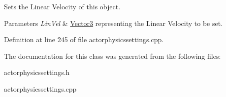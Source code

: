 Sets the Linear Velocity of this object. 


\begin{DoxyParams}{Parameters}
{\em LinVel} & \hyperlink{classphys_1_1Vector3}{Vector3} representing the Linear Velocity to be set. \\
\hline
\end{DoxyParams}


Definition at line 245 of file actorphysicssettings.cpp.



The documentation for this class was generated from the following files:\begin{DoxyCompactItemize}
\item 
actorphysicssettings.h\item 
actorphysicssettings.cpp\end{DoxyCompactItemize}
